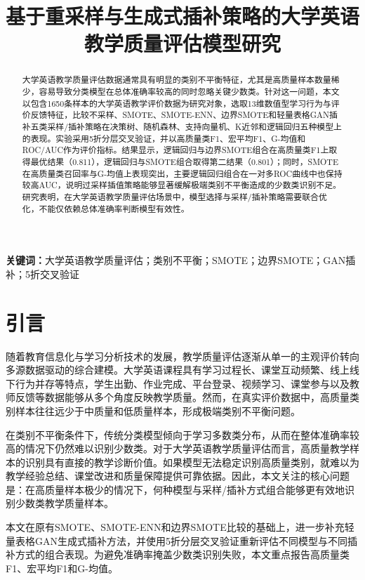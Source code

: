 \documentclass[UTF8,a4paper,12pt,fontset=fandol]{ctexart}
\title{基于重采样与生成式插补策略的大学英语教学质量评估模型研究}
\author{}
\date{}
\begin{document}
\maketitle

\begin{abstract}
大学英语教学质量评估数据通常具有明显的类别不平衡特征，尤其是高质量样本数量稀少，容易导致分类模型在总体准确率较高的同时忽略关键少数类。针对这一问题，本文以包含1650条样本的大学英语教学评价数据为研究对象，选取13维数值型学习行为与评价反馈特征，比较不采样、SMOTE、SMOTE-ENN、边界SMOTE和轻量表格GAN插补五类采样/插补策略在决策树、随机森林、支持向量机、K近邻和逻辑回归五种模型上的表现。实验采用5折分层交叉验证，并以高质量类F1、宏平均F1、G-均值和ROC/AUC作为评价指标。结果显示，逻辑回归与边界SMOTE组合在高质量类F1上取得最优结果（0.811），逻辑回归与SMOTE组合取得第二结果（0.801）；同时，SMOTE在高质量类召回率与G-均值上表现突出，主要逻辑回归组合在一对多ROC曲线中也保持较高AUC，说明过采样插值策略能够显著缓解极端类别不平衡造成的少数类识别不足。研究表明，在大学英语教学质量评估场景中，模型选择与采样/插补策略需要联合优化，不能仅依赖总体准确率判断模型有效性。
\end{abstract}

\noindent\textbf{关键词：}大学英语教学质量评估；类别不平衡；SMOTE；边界SMOTE；GAN插补；5折交叉验证

\section{引言}
随着教育信息化与学习分析技术的发展，教学质量评估逐渐从单一的主观评价转向多源数据驱动的综合建模。大学英语课程具有学习过程长、课堂互动频繁、线上线下行为并存等特点，学生出勤、作业完成、平台登录、视频学习、课堂参与以及教师反馈等数据能够从多个角度反映教学质量。然而，在真实评价数据中，高质量类别样本往往远少于中质量和低质量样本，形成极端类别不平衡问题。

在类别不平衡条件下，传统分类模型倾向于学习多数类分布，从而在整体准确率较高的情况下仍然难以识别少数类。对于大学英语教学质量评估而言，高质量教学样本的识别具有直接的教学诊断价值。如果模型无法稳定识别高质量类别，就难以为教学经验总结、课堂改进和质量保障提供可靠依据。因此，本文关注的核心问题是：在高质量样本极少的情况下，何种模型与采样/插补方式组合能够更有效地识别少数类教学质量样本。

本文在原有SMOTE、SMOTE-ENN和边界SMOTE比较的基础上，进一步补充轻量表格GAN生成式插补方法，并使用5折分层交叉验证重新评估不同模型与不同插补方式的组合表现。为避免准确率掩盖少数类识别失败，本文重点报告高质量类F1、宏平均F1和G-均值。
\end{document}
